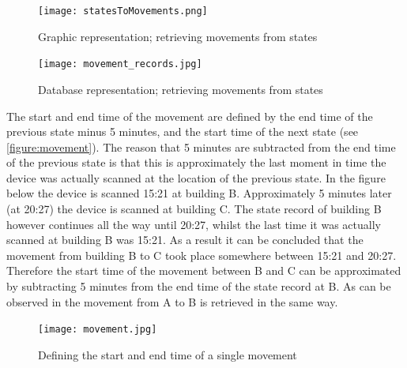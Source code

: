 \begin{figure}[H]
\centering
\texttt{[image: statesToMovements.png]}
\captionsetup{justification=centering}
\caption{Graphic representation; retrieving movements from states}
\label{figure:statesToMovements}
\end{figure}

\begin{figure}[H]
\centering
\texttt{[image: movement\_records.jpg]}
\captionsetup{justification=centering}
\caption{Database representation; retrieving movements from states}
\label{figure:movementrecs}
\end{figure}

The start and end time of the movement are defined by the end time of the previous state minus 5 minutes, and the start time of the next state (see \autoref{figure:movement}). The reason that 5 minutes are subtracted from the end time of the previous state is that this is approximately the last moment in time the device was actually scanned at the location of the previous state. In the figure below the device is scanned 15:21 at building B. Approximately 5 minutes later (at 20:27) the device is scanned at building C. The state record of building B however continues all the way until 20:27, whilst the last time it was actually scanned at building B was 15:21. As a result it can be concluded that the movement from building B to C took place somewhere between 15:21 and 20:27. Therefore the start time of the movement between B and C can be approximated by subtracting 5 minutes from the end time of the state record at B. As can be observed in the movement from A to B is retrieved in the same way.

\begin{figure}[H]
\centering
\texttt{[image: movement.jpg]}
\captionsetup{justification=centering}
\caption{Defining the start and end time of a single movement}
\label{figure:movement}
\end{figure}


